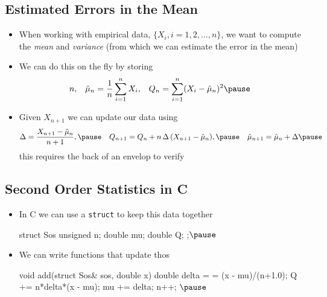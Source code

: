 \begin{slide}
\section[-2]{Estimated Errors in the Mean}

\begin{PauseHighLight}
  \begin{itemize}
  \item When working with empirical data, $\{X_i, i=1,2,\ldots,n\}$,
    we want to compute the \textit{mean} and \textit{variance} (from
    which we can estimate the error in the mean)\pause
  \item We can do this on the fly by storing
    \begin{align*}
      n, && \hat{\mu}_n &= \frac{1}{n} \sum_{i=1}^n X_i,
      & Q_n &= \sum_{i=1}^n (X_i - \hat{\mu}_n)^2 \pause
    \end{align*}
  \item Given $X_{n+1}$ we can update our data using
    \begin{align*}
      \Delta &= \frac{X_{n+1} - \hat{\mu}_n}{n+1},\pause
      & Q_{n+1} &= Q_n + n\,\Delta\,(X_{n+1}-\hat{\mu}_n),\pause
      & \hat{\mu}_{n+1} = \hat{\mu}_n + \Delta\pause
    \end{align*}
    this requires the back of an envelop to verify\pauseb
  \end{itemize}
\end{PauseHighLight}

\end{slide}


\begin{slide}
\section[-2]{Second Order Statistics in C}
  
\begin{PauseHighLight}
  \begin{itemize}
  \item In C we can use a \texttt{struct} to keep this data together
    \begin{cpp}
      struct Sos {
        unsigned n;
        double mu;
        double Q;
      };$\pause$
    \end{cpp}
  \item We can write functions that update thos
    \begin{cpp}
      void add(struct Sos& sos, double x) {
        double delta = = (x - mu)/(n+1.0);
        Q += n*delta*(x - mu);
        mu += delta;
        n++;
      }$\pause$
    \end{cpp}
  \end{itemize}
\end{PauseHighLight}

\end{slide}

